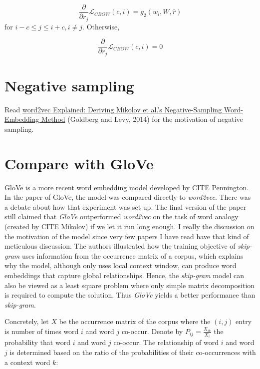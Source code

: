 \documentclass[11pt,letterpaper]{article}
\begin{document}
\begin{equation}
 \frac{\partial}{\partial r_j} \mathcal{L}_{CBOW}(c, i) = g_2(w_i, W, \hat{r})
\end{equation} for  $i - c \leq j \leq i + c, i \neq j$.  Otherwise,

\begin{equation}
 \frac{\partial}{\partial r_j} \mathcal{L}_{CBOW}(c, i) = 0
\end{equation}




\section{Negative sampling}

Read \href{http://arxiv.org/pdf/1402.3722v1.pdf}{word2vec Explained: Deriving Mikolov et al.'s
Negative-Sampling Word-Embedding Method} (Goldberg and Levy, 2014) for the motivation of negative sampling.

\section{Compare with GloVe}

GloVe is a more recent word embedding model developed by CITE Pennington. In the paper of GloVe, the model was compared directly to \emph{word2vec}. There was a debate about how that experiment was set up. The final version of the paper still claimed that \emph{GloVe} outperformed \emph{word2vec} on the task of word analogy (created by CITE Mikolov) if we let it run long enough. I really the discussion on the motivation of the model since very few papers I have read have that kind of meticulous discussion. The authors illustrated how the training objective of \emph{skip-gram} uses information from the occurrence matrix of a corpus, which explains why the model, although only uses local context window, can produce word embeddings that capture global relationships. Hence, the \emph{skip-gram} model can also be viewed as a least square problem where only simple matrix decomposition is required to compute the solution. Thus \emph{GloVe} yields a better performance than \emph{skip-gram}.

Concretely, let $X$ be the occurrence matrix of the corpus where the $(i, j)$ entry is number of times word $i$ and word $j$ co-occur. Denote by $P_{ij} = \frac{X_{ik}}{X_i}$ the probability that word $i$ and word $j$ co-occur. The relationship of word $i$ and word $j$ is determined based on the ratio of the probabilities of their co-occurrences with a context word $k$:
\end{document}
